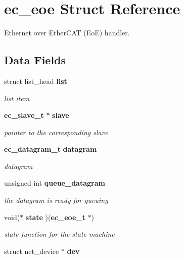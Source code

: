 \section{ec\-\_\-eoe Struct Reference}
\label{structec__eoe}


Ethernet over Ether\-C\-A\-T (Eo\-E) handler.  


\subsection*{Data Fields}
\begin{DoxyCompactItemize}
\item 
struct list\-\_\-head {\bf list}\label{structec__eoe_af41c63118154c1645769f19658256df0}

\begin{DoxyCompactList}\small\item\em list item \end{DoxyCompactList}\item 
{\bf ec\-\_\-slave\-\_\-t} $\ast$ {\bf slave}\label{structec__eoe_a4a07acce0d52dfec65250bb9e8152976}

\begin{DoxyCompactList}\small\item\em pointer to the corresponding slave \end{DoxyCompactList}\item 
{\bf ec\-\_\-datagram\-\_\-t} {\bf datagram}\label{structec__eoe_a58a38a4520677a172eb12ed44d230502}

\begin{DoxyCompactList}\small\item\em datagram \end{DoxyCompactList}\item 
unsigned int {\bf queue\-\_\-datagram}\label{structec__eoe_a3a3a486cb3359c0d528e4e4e37a6953d}

\begin{DoxyCompactList}\small\item\em the datagram is ready for queuing \end{DoxyCompactList}\item 
void($\ast$ {\bf state} )({\bf ec\-\_\-eoe\-\_\-t} $\ast$)\label{structec__eoe_a13b721b4041a46522ddce127720095d1}

\begin{DoxyCompactList}\small\item\em state function for the state machine \end{DoxyCompactList}\item 
struct net\-\_\-device $\ast$ {\bf dev}\label{structec__eoe_aa11f7b383aa09219aca3cfeffcdb55df}


\end{DoxyCompactItemize}
